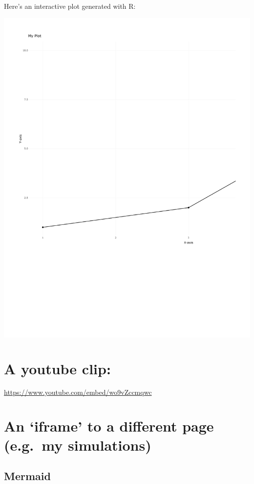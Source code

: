 \documentclass[
  letterpaper,
  DIV=11,
  numbers=noendperiod]{scrreprt}
\theoremstyle{definition}
\theoremstyle{remark}
\begin{document}
Here's an interactive plot generated with R:

\includegraphics{morpho_intro_text_files/figure-pdf/unnamed-chunk-1-1.pdf}

\section{A youtube clip:}\label{a-youtube-clip-5}

\url{https://www.youtube.com/embed/wo9vZccmqwc}

\section{An `iframe' to a different page (e.g.~my
simulations)}\label{an-iframe-to-a-different-page-e.g.-my-simulations-5}

\subsection{Mermaid}\label{mermaid-5}
\end{document}
